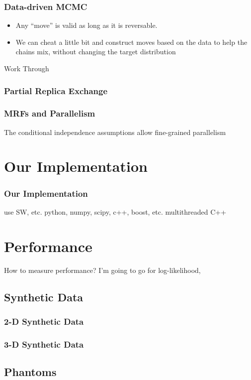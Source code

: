\documentclass{beamer}
\begin{document}
\begin{frame}
  \frametitle{Data-driven MCMC}
  \begin{itemize}
    \item Any ``move'' is valid as long as it is reversable.  
    \item We can cheat a little bit and construct moves based on the data to help the chains mix, 
      without changing the target distribution
  \end{itemize}
  
  \cite{zhuowen_tu_image_2002}
  Work Through
\end{frame}

\begin{frame}
  \frametitle{Partial Replica Exchange}
  \cite{Liang_Evolutionary_2000}
\end{frame}

\begin{frame}
  \frametitle{MRFs and Parallelism}
  The conditional independence assumptions allow fine-grained parallelism
  
\end{frame}

\section{Our Implementation}
\begin{frame}
  \frametitle{Our Implementation}
  use SW, etc. 
  python, numpy, scipy, c++, boost, etc. 
  multithreaded C++ 
\end{frame}

\section{Performance}

How to measure performance? I'm going to go for 
log-likelihood, 

\subsection{Synthetic Data}
\begin{frame}
  \frametitle{2-D Synthetic Data}
\end{frame}

\begin{frame}
  \frametitle{3-D Synthetic Data}
\end{frame}

\subsection{Phantoms}
\end{document}
